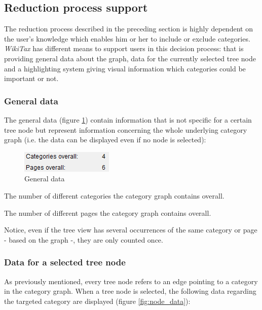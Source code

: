 \documentclass{scrartcl}
\begin{document}
\subsection{Reduction process support}
\label{sec:support}
The reduction process described in the preceding section is highly dependent on the user's knowledge which enables him or her to include or exclude categories. \emph{WikiTax} has different means to support users in this decision process: that is providing general data about the graph, data for the currently selected tree node and a highlighting system giving visual information which categories could be important or not.

\subsubsection{General data}

The general data (figure \ref{fig:general_data}) contain information that is not specific for a certain tree node but represent information concerning the whole underlying category graph (i.e. the data can be displayed even if no node is selected):

\begin{figure}[ht]
\centering
\includegraphics[scale=0.7]{figures/general_data.png}
\caption{General data}
\label{fig:general_data}
\end{figure}

\begin{description}
\small
\item[Categories overall] The number of different categories the category graph contains overall.
\item[Pages overall] The number of different pages the category graph contains overall.
\end{description}

Notice, even if the tree view has several occurrences of the same category or page - based on the graph -, they are only counted once.

\subsubsection{Data for a selected tree node}

As previously mentioned, every tree node refers to an edge pointing to a category in the category graph. When a tree node is selected, the following data regarding the targeted category are displayed (figure \ref{fig:node_data}):
\end{document}
